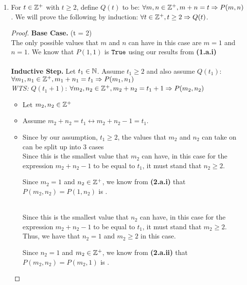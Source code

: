 \documentclass[12pt]{article}
\theoremstyle{definition}
\begin{document}
\begin{enumerate}
    \item For $t \in \mathbb Z^+$ with $t \geq 2$, define $Q(t)$ to be: $\forall m, n \in \mathbb Z^+, m + n = t \mathrel{\Rightarrow} P(m, n)$. We will prove the following by induction: $\forall t \in \mathbb Z^+, t \geq 2 \mathrel{\Rightarrow} Q(t)$.
        \begin{proof} 
            \textbf{Base Case. }(t = 2)  \\ 
            The only possible values that $m$ and $n$ can have in this case are $m = 1$ and $n = 1$. We know that $P(1, 1)$ is $\texttt{True}$ using our results from \textbf{(1.a.i)} \\
            \\ 
            \textbf{Inductive Step. }Let $t_1 \in \mathbb N$. Assume $t_1 \geq 2$ and also assume $Q(t_1)$: $\forall m_1, n_1 \in \mathbb Z^+, m_1 + n_1 = t_1 \mathrel{\Rightarrow} P(m_1, n_1)$ \\
            \textit{WTS:} $Q(t_1 + 1)$: $\forall m_2, n_2 \in \mathbb Z^+, m_2 + n_2 = t_1 + 1 \mathrel{\Rightarrow} P(m_2, n_2)$ 
            \begin{itemize}
                \item Let $m_2, n_2 \in \mathbb Z^+$
                \item Assume $m_2 + n_2 = t_1 \leftrightarrow m_2 +n_2 -1  = t_1$. \item Since by our assumption, $t_1 \geq 2$, the values that $m_2$ and $n_2$ can take on can be split up into 3 cases 
                 \\ 
                Since this is the smallest value that $m_2$ can have, in this case for the expression $m_2 + n_2 - 1$ to be equal to $t_1$, it must stand that $n_2\geq 2$.
                
                Since $m_2 = 1$ and $n_2 \in \mathbb Z^+$, we know from \textbf{(2.a.i)} that $P(m_2, n_2) = P(1, n_2)$ is \True.
                
                 \\ 
                Since this is the smallest value that $n_2$ can have, in this case for the expression $m_2 + n_2 - 1$ to be equal to $t_1$, it must stand that $m_2 \geq 2$.
                Thus, we have that $n_2 = 1$ and $m_2 \geq 2$ in this case.
                
                Since $n_2 = 1$ and $m_2 \in \mathbb Z^+$, we know from \textbf{(2.a.ii)} that $P(m_2, n_2) = P(m_2, 1)$ is \True.
                

\end{itemize}
\end{proof}
\end{enumerate}
\end{document}
